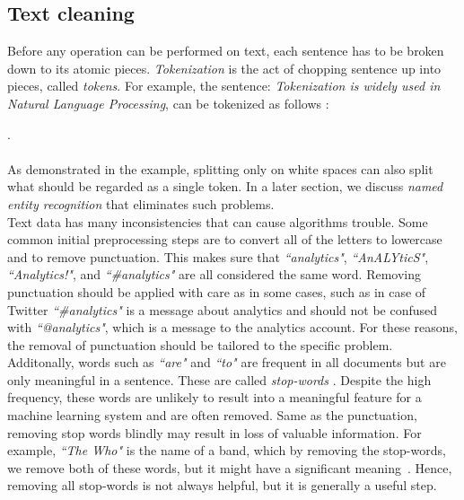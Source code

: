 \subsection{Text cleaning }
Before any operation can be performed on text, each sentence has to be broken down to its atomic pieces. \emph{Tokenization} is the act of chopping sentence up into pieces, called \emph{tokens}.  For example, the sentence: \emph{Tokenization is widely used in Natural Language Processing}, can be tokenized as follows : 

     .\\
\\
As demonstrated in the example, splitting only on white spaces can also split what should be regarded as a single token. In a later section, we discuss \emph{named entity recognition} that eliminates such problems.  \\
\noindent
Text data has many inconsistencies that can cause algorithms trouble. Some common initial preprocessing steps are to convert all of the letters to lowercase and to remove punctuation. 
This makes sure that \emph{``analytics"}, \emph{``AnALYticS"}, \emph{``Analytics!"}, and \emph{``\#analytics"} are all considered the same word. Removing punctuation should be applied with care as in some cases, such as in case of Twitter \emph{``\#analytics"} is a message about analytics and should not be confused with \emph{``@analytics"}, which is a message to the  analytics account. For these reasons, the removal of punctuation should be tailored to the specific problem.\\
Additonally, words such as \emph{``are"} and \emph{``to"} are frequent in all documents but are only meaningful in a sentence. These are called \emph{stop-words} . Despite the high frequency, these words are unlikely to result into a meaningful feature for a machine learning system and are often removed. Same as the punctuation, removing stop words blindly may result in loss of valuable information. For example, \emph{``The Who"} is the name of a band, which by removing the stop-words, we remove both of these words, but it might have a significant meaning~. Hence, removing all stop-words is not always helpful, but it is generally a useful step. 


